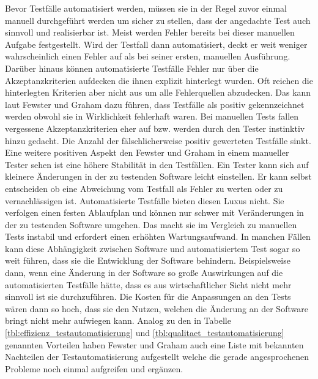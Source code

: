 Bevor Testfälle automatisiert werden, müssen sie in der Regel zuvor einmal manuell durchgeführt werden um sicher zu stellen, dass der angedachte Test auch sinnvoll und realisierbar ist. Meist werden Fehler bereits bei dieser manuellen Aufgabe festgestellt. Wird der Testfall dann automatisiert, deckt er weit weniger wahrscheinlich einen Fehler auf als bei seiner ersten, manuellen Ausführung. Darüber hinaus können automatisierte Testfälle Fehler nur über die Akzeptanzkriterien aufdecken die ihnen explizit hinterlegt wurden. Oft reichen die hinterlegten Kriterien aber nicht aus um alle Fehlerquellen abzudecken. Das kann laut Fewster und Graham \cite[vgl. S. 23 ff.]{fewster_software_1999} dazu führen, dass Testfälle als positiv gekennzeichnet werden obwohl sie in Wirklichkeit fehlerhaft waren. Bei manuellen Tests fallen vergessene Akzeptanzkriterien eher auf bzw. werden durch den Tester instinktiv hinzu gedacht. Die Anzahl der fälschlicherweise positiv gewerteten Testfälle sinkt. Eine weitere positiven Aspekt den Fewster und Graham \cite[vgl. S. 24 ff.]{fewster_software_1999} in einem manueller Tester sehen ist eine höhere Stabilität in den Testfällen. Ein Tester kann sich auf kleinere Änderungen in der zu testenden Software leicht einstellen. Er kann selbst entscheiden ob eine Abweichung vom Testfall als Fehler zu werten oder zu vernachlässigen ist. Automatisierte Testfälle bieten diesen Luxus nicht. Sie verfolgen einen festen Ablaufplan und können nur schwer mit Veränderungen in der zu testenden Software umgehen. Das macht sie im Vergleich zu manuellen Tests instabil und erfordert einen erhöhten Wartungsaufwand. In manchen Fällen kann diese Abhängigkeit zwischen Software und automatisiertem Test sogar so weit führen, dass sie die Entwicklung der Software behindern. Beispielsweise dann, wenn eine Änderung in der Software so große Auswirkungen auf die automatisierten Testfälle hätte, dass es aus wirtschaftlicher Sicht nicht mehr sinnvoll ist sie durchzuführen. Die Kosten für die Anpassungen an den Tests wären dann so hoch, dass sie den Nutzen, welchen die Änderung an der Software bringt nicht mehr aufwiegen kann.
Analog zu den in Tabelle \ref{tbl:effizienz_testautomatisierung} und \ref{tbl:qualitaet_testautomatisierung} genannten Vorteilen haben Fewster und Graham \cite[vgl. S. 10 ff.]{fewster_software_1999} auch eine Liste mit bekannten Nachteilen der Testautomatisierung aufgestellt welche die gerade angesprochenen Probleme noch einmal aufgreifen und ergänzen.

